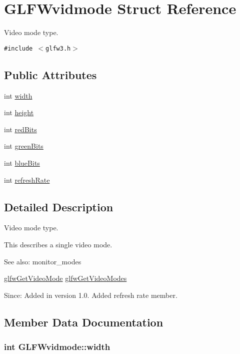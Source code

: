 \hypertarget{struct_g_l_f_wvidmode}{
\section{GLFWvidmode Struct Reference}
\label{struct_g_l_f_wvidmode}
}
Video mode type.  


{\tt \#include $<$glfw3.h$>$}

\subsection*{Public Attributes}
\begin{CompactItemize}
\item 
int \hyperlink{struct_g_l_f_wvidmode_698dcb200562051a7249cb6ae154c71d}{width}
\item 
int \hyperlink{struct_g_l_f_wvidmode_c65942a5f6981695517437a9d571d03c}{height}
\item 
int \hyperlink{struct_g_l_f_wvidmode_6066c4ecd251098700062d3b735dba1b}{redBits}
\item 
int \hyperlink{struct_g_l_f_wvidmode_292fdd281f3485fb3ff102a5bda43faa}{greenBits}
\item 
int \hyperlink{struct_g_l_f_wvidmode_f310977f58d2e3b188175b6e3d314047}{blueBits}
\item 
int \hyperlink{struct_g_l_f_wvidmode_791bdd6c7697b09f7e9c97054bf05649}{refreshRate}
\end{CompactItemize}


\subsection{Detailed Description}
Video mode type. 

This describes a single video mode.

\begin{Desc}
\item[See also:]monitor\_\-modes 

\hyperlink{group__monitor_gc234b63ec525c70d7e18ac84aca088c6}{glfwGetVideoMode} \hyperlink{group__monitor_g811c28d61595e630774389985947c665}{glfwGetVideoModes}\end{Desc}
\begin{Desc}
\item[Since:]Added in version 1.0.  Added refresh rate member. \end{Desc}


\subsection{Member Data Documentation}
\hypertarget{struct_g_l_f_wvidmode_698dcb200562051a7249cb6ae154c71d}{
\subsubsection[width]{\setlength{\rightskip}{0pt plus 5cm}int {\bf GLFWvidmode::width}}}
\label{struct_g_l_f_wvidmode_698dcb200562051a7249cb6ae154c71d}


